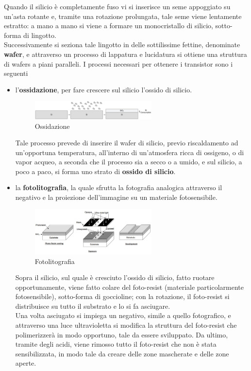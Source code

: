 \documentclass[a4paper]{extarticle}
\begin{document}
\noindent
Quando il silicio è completamente fuso vi si inserisce un seme appoggiato su un'asta rotante e, tramite una rotazione prolungata, tale seme viene lentamente estratto: a mano a mano si viene a formare un monocristallo di silicio, sotto-forma di lingotto.\\
Successivamente si seziona tale lingotto in delle sottilissime fettine, denominate \textbf{wafer}, e attraverso un processo di lappatura e lucidatura si ottiene una struttura di wafers a piani paralleli. I processi necessari per ottenere i transistor sono i seguenti
\begin{itemize}
    \item l'\textbf{ossidazione}, per fare crescere sul silicio l'ossido di silicio.
    
    \begin{figure}[H]
        \centering
        \includegraphics[width=0.6\textwidth]{ossidazione.png}
        \caption{Ossidazione}
        \label{fig:ossidazione}
    \end{figure}

    \noindent
    Tale processo prevede di inserire il wafer di silicio, previo riscaldamento ad un'opportuna temperatura, all'interno di un'atmosfera ricca di ossigeno, o di vapor acqueo, a seconda che il processo sia a secco o a umido, e sul silicio, a poco a paco, si forma uno strato di \textbf{ossido di silicio}.

    \item la \textbf{fotolitografia}, la quale sfrutta la fotografia analogica attraverso il negativo e la proiezione dell'immagine su un materiale fotosensibile.
    
    \begin{figure}[H]
        \centering
        \includegraphics[width=0.6\textwidth]{fotolitografia.png}
        \caption{Fotolitografia}
        \label{fig:fotolitografia}
    \end{figure}

    \noindent
    Sopra il silicio, sul quale è cresciuto l'ossido di silicio, fatto ruotare opportunamente, viene fatto colare del foto-resist (materiale particolarmente fotosensibile), sotto-forma di goccioline; con la rotazione, il foto-resist si distribuisce su tutto il substrato e lo si fa asciugare.\\
    Una volta asciugato si impiega un negativo, simile a quello fotografico, e attraverso una luce ultravioletta si modifica la struttura del foto-resist che polimerizzerà in modo opportuno, tale da essere sviluppato. Da ultimo, tramite degli acidi, viene rimosso tutto il foto-resist che non è stata sensibilizzata, in modo tale da creare delle zone mascherate e delle zone aperte.


\end{itemize}
\end{document}
